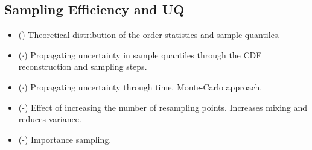\subsection{Sampling Efficiency and UQ}


\begin{itemize}
    \item (\checkmark) Theoretical distribution of the order statistics and sample quantiles.
    \item ($\cdot$) Propagating uncertainty in sample quantiles through the CDF reconstruction and sampling steps.
    \item ($\cdot$) Propagating uncertainty through time.  Monte-Carlo approach.
    \item (\checkmark-) Effect of increasing the number of resampling points.  Increases mixing and reduces variance.
    \item (\checkmark-) Importance sampling.
\end{itemize}
